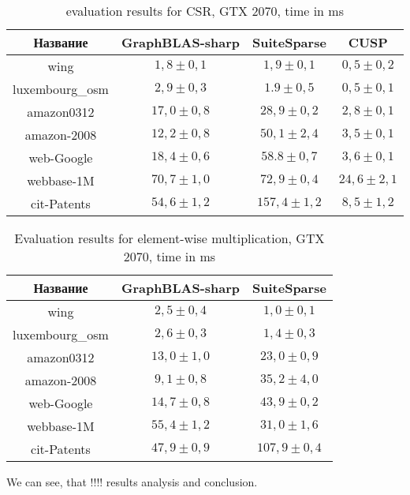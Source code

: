 \begin{table}[h]
    \centering
    \caption{evaluation results for CSR, GTX 2070, time in ms}
    \label{platform-comparison}

    \begin{tabular}{|c||c|c|c|}
    \hline
    Название            & GraphBLAS-sharp & SuiteSparse & CUSP        \\
    \hline
    \hline
    wing            & $1,8 \pm 0,1$      & $1,9\pm 0,1$   & $0,5\pm 0,2$   \\
    \hline
    luxembourg\_osm & $2,9 \pm 0,3$      & $1.9\pm 0,5$   & $0,5\pm 0,1$   \\
    \hline
    amazon0312      & $17,0 \pm 0,8$      & $28,9\pm 0,2$  & $2,8\pm 0,1$   \\
    \hline
    amazon-2008     & $12,2 \pm 0,8$     & $50,1\pm 2,4$  & $3,5\pm 0,1$   \\
    \hline
    web-Google      & $18,4 \pm 0,6$     & $58.8\pm 0,7$  & $3,6\pm 0,1$   \\
    \hline
    webbase-1M      & $70,7 \pm 1,0$      & $72,9\pm 0,4$  & $24,6\pm 2,1$  \\
    \hline
    cit-Patents     & $54,6 \pm 1,2$      & $157,4\pm 1,2$ & $8,5\pm 1,2$   \\     
    \hline
    \end{tabular}
\end{table}

\begin{table}[h]

    \centering
    \caption{Evaluation results for element-wise multiplication, GTX 2070, time in ms}
    \label{mult-comparison}
    
    \begin{tabular}{|c||c|c|}
    \hline
    Название            & GraphBLAS-sharp & SuiteSparse    \\
    \hline
    \hline
    wing            & $2,5 \pm 0,4$      & $1,0 \pm 0,1$ \\
    \hline
    luxembourg\_osm & $2,6 \pm 0,3$       & $1,4 \pm 0,3$ \\
    \hline
    amazon0312      & $13,0 \pm 1,0$     & $23,0 \pm 0,9$ \\
    \hline
    amazon-2008     & $9,1 \pm 0,8$    & $35,2 \pm 4,0$ \\
    \hline
    web-Google      & $14,7 \pm 0,8$      & $43,9 \pm 0,2$  \\
    \hline
    webbase-1M      & $55,4 \pm 1,2$      & $31,0 \pm 1,6$ \\
    \hline
    cit-Patents     & $47,9 \pm 0,9$      & $107,9 \pm 0,4$  \\     
    \hline
    \end{tabular}
\end{table}
We can see, that !!!! results analysis and conclusion.
